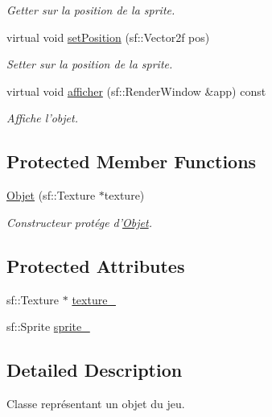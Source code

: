 \begin{DoxyCompactItemize}
\begin{DoxyCompactList}\small\item\em Getter sur la position de la sprite. \end{DoxyCompactList}\item 
\hypertarget{classObjet_acd368d997fde30215d93429c187cb245}{virtual void \hyperlink{classObjet_acd368d997fde30215d93429c187cb245}{set\-Position} (sf\-::\-Vector2f pos)}\label{classObjet_acd368d997fde30215d93429c187cb245}

\begin{DoxyCompactList}\small\item\em Setter sur la position de la sprite. \end{DoxyCompactList}\item 
virtual void \hyperlink{classObjet_a45b7da0eb3776e3771578141a1529c45}{afficher} (sf\-::\-Render\-Window \&app) const 
\begin{DoxyCompactList}\small\item\em Affiche l'objet. \end{DoxyCompactList}\end{DoxyCompactItemize}
\subsection*{Protected Member Functions}
\begin{DoxyCompactItemize}
\item 
\hyperlink{classObjet_a1ad19af369b79162f0318a7746685f69}{Objet} (sf\-::\-Texture $\ast$texture)
\begin{DoxyCompactList}\small\item\em Constructeur protége d'\hyperlink{classObjet}{Objet}. \end{DoxyCompactList}\end{DoxyCompactItemize}
\subsection*{Protected Attributes}
\begin{DoxyCompactItemize}
\item 
sf\-::\-Texture $\ast$ \hyperlink{classObjet_a5d76923ada7af8e557d72e66101c77d1}{texture\-\_\-}
\item 
sf\-::\-Sprite \hyperlink{classObjet_a14d6ec296ba26ecd160e1035563b9770}{sprite\-\_\-}
\end{DoxyCompactItemize}


\subsection{Detailed Description}
Classe représentant un objet du jeu. 

